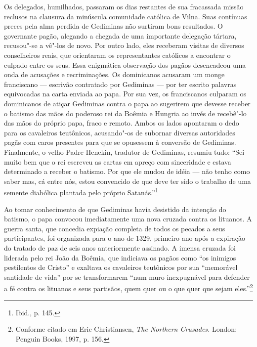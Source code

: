 Os delegados, humilhados, passaram os dias restantes de sua fracassada
missão reclusos na clausura da minúscula comunidade católica de Vilna.
Suas contínuas preces pela alma perdida de Gediminas não surtiram bons
resultados. O governante pagão, alegando a chegada de uma importante
delegação tártara, recusou"-se a vê"-los de novo. Por outro lado, eles
receberam visitas de diversos conselheiros reais, que orientaram os
representantes católicos a encontrar o culpado entre os seus. Essa
enigmática observação dos pagãos desencadeou uma onda de acusações e
recriminações. Os dominicanos acusaram um monge franciscano --- escrivão
contratado por Gediminas --- por ter escrito palavras equivocadas na carta
enviada ao papa. Por sua vez, os franciscanos culparam os dominicanos de
atiçar Gediminas contra o papa ao sugerirem que devesse receber o
batismo das mãos do poderoso rei da Boêmia e Hungria ao invés de
recebê"-lo das mãos do próprio papa, fraco e remoto. Ambos os lados
apontaram o dedo para os cavaleiros teutônicos, acusando"-os de subornar
diversas autoridades pagãs com caros presentes para que se opusessem à
conversão de Gediminas. Finalmente, o velho Padre Henekin, tradutor de
Gediminas, resumiu tudo: ``Sei muito bem que o rei escreveu as cartas em
apreço com sinceridade e estava determinado a receber o batismo. Por que
ele mudou de idéia --- não tenho como saber mas, cá entre nós, estou
convencido de que deve ter sido o trabalho de uma semente diabólica
plantada pelo próprio Satanás.''\footnote{Ibid., p. 145.}

Ao tomar conhecimento de que Gediminas havia desistido da intenção do
batismo, o papa convocou imediatamente uma nova cruzada contra os
lituanos. A guerra santa, que concedia expiação completa de todos os
pecados a seus participantes, foi organizada para o ano de 1329,
primeiro ano após a expiração do tratado de paz de seis anos
anteriormente assinado. A imensa cruzada foi liderada pelo rei João da
Boêmia, que indiciava os pagãos como ``os inimigos pestilentos de
Cristo'' e exaltava os cavaleiros teutônicos por sua ``memorável
santidade de vida'' por se transformarem ``num muro inexpugnável para
defender a fé contra os lituanos e seus partisãos, quem quer ou o que
quer que sejam eles.''\footnote{Conforme citado em Eric Christiansen,
  \emph{The Northern Crusades.} London: Penguin Books, 1997, p. 156.}

%

